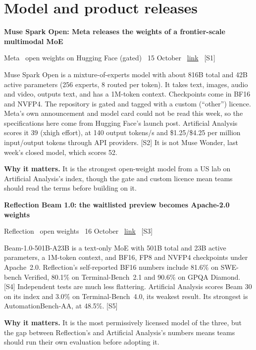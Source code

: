 \documentclass[11pt,a4paper]{article}
\newcommand{\entry}[4]{%
  \par\vspace{0.7em}%
  {\sffamily\bfseries\color{brandink}#1}\par
  {\footnotesize\color{brandgrey}#2 \textbullet\ \href{#3}{link} \textbullet\ \srcref{#4}}\par
  \vspace{0.15em}}
\newcommand{\why}[1]{\par{\small\textbf{Why it matters.} #1}\par}
\newcommand{\srcref}[1]{\textcolor{brandaccent}{[S#1]}}
\begin{document}
\section{Model and product releases}

\entry{Muse Spark Open: Meta releases the weights of a frontier-scale multimodal MoE}{Meta \textbullet\ open weights on Hugging Face (gated) \textbullet\ 15 October}{https://huggingface.co/blog/meta-muse-spark-open}{1}
Muse Spark Open is a mixture-of-experts model with about 816B total and 42B active parameters
(256 experts, 8 routed per token). It takes text, images, audio and video, outputs text, and has a 1M-token
context. Checkpoints come in BF16 and NVFP4. The repository is gated and tagged with a custom
(``other'') licence. Meta's own announcement and model card could not be read this week, so the
specifications here come from Hugging Face's launch post. Artificial Analysis scores it 39 (xhigh effort),
at 140 output tokens/s and \$1.25/\$4.25 per million input/output tokens through API providers. \srcref{2}
It is not Muse Wonder, last week's closed model, which scores 52.
\why{It is the strongest open-weight model from a US lab on Artificial Analysis's index, though the gate and custom licence mean teams should read the terms before building on it.}

\entry{Reflection Beam 1.0: the waitlisted preview becomes Apache-2.0 weights}{Reflection \textbullet\ open weights \textbullet\ 16 October}{https://huggingface.co/blog/reflection-beam}{3}
Beam-1.0-501B-A23B is a text-only MoE with 501B total and 23B active parameters, a 1M-token context, and
BF16, FP8 and NVFP4 checkpoints under Apache~2.0. Reflection's self-reported BF16 numbers include 81.6\% on
SWE-bench Verified, 80.1\% on Terminal-Bench~2.1 and 90.6\% on GPQA Diamond. \srcref{4} Independent tests are
much less flattering. Artificial Analysis scores Beam 30 on its index and 3.0\% on Terminal-Bench~4.0, its weakest
result. Its strongest is AutomationBench-AA, at 48.5\%. \srcref{5}
\why{It is the most permissively licensed model of the three, but the gap between Reflection's and Artificial Analysis's numbers means teams should run their own evaluation before adopting it.}
\end{document}
